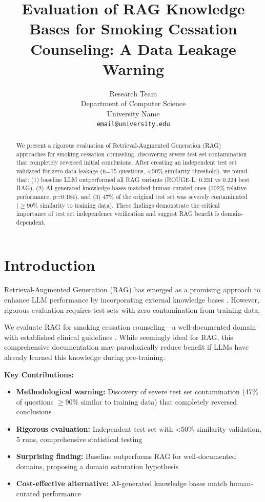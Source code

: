 \documentclass[11pt]{article}
\title{Evaluation of RAG Knowledge Bases for Smoking Cessation Counseling: A Data Leakage Warning}
\author{Research Team \\
  Department of Computer Science \\
  University Name \\
  \texttt{email@university.edu}}
\begin{document}
\maketitle

\begin{abstract}
We present a rigorous evaluation of Retrieval-Augmented Generation (RAG) approaches for smoking cessation counseling, discovering severe test set contamination that completely reversed initial conclusions. After creating an independent test set validated for zero data leakage (n=15 questions, <50\% similarity threshold), we found that: (1) baseline LLM outperformed all RAG variants (ROUGE-L: 0.231 vs 0.224 best RAG), (2) AI-generated knowledge bases matched human-curated ones (102\% relative performance, p=0.184), and (3) 47\% of the original test set was severely contaminated ($\geq$90\% similarity to training data). These findings demonstrate the critical importance of test set independence verification and suggest RAG benefit is domain-dependent.
\end{abstract}

\section{Introduction}

Retrieval-Augmented Generation (RAG) has emerged as a promising approach to enhance LLM performance by incorporating external knowledge bases \cite{lewis2020retrieval}. However, rigorous evaluation requires test sets with zero contamination from training data.

We evaluate RAG for smoking cessation counseling—a well-documented domain with established clinical guidelines \cite{fiore2008treating}. While seemingly ideal for RAG, this comprehensive documentation may paradoxically reduce benefit if LLMs have already learned this knowledge during pre-training.

\textbf{Key Contributions:}
\begin{itemize}
    \item \textbf{Methodological warning:} Discovery of severe test set contamination (47\% of questions $\geq$90\% similar to training data) that completely reversed conclusions
    \item \textbf{Rigorous evaluation:} Independent test set with <50\% similarity validation, 5 runs, comprehensive statistical testing
    \item \textbf{Surprising finding:} Baseline outperforms RAG for well-documented domains, proposing a domain saturation hypothesis
    \item \textbf{Cost-effective alternative:} AI-generated knowledge bases match human-curated performance
\end{itemize}
\end{document}
